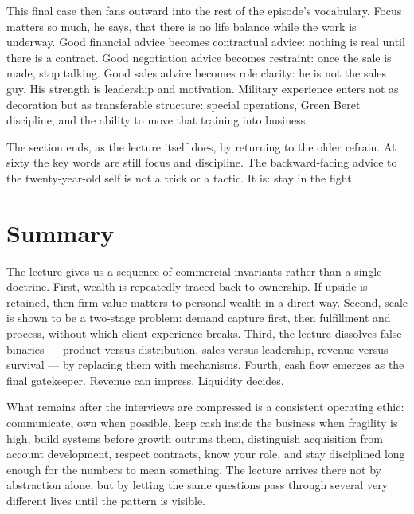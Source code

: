 This final case then fans outward into the rest of the episode's vocabulary. Focus matters so much, he says, that there is no life balance while the work is underway. Good financial advice becomes contractual advice: nothing is real until there is a contract. Good negotiation advice becomes restraint: once the sale is made, stop talking. Good sales advice becomes role clarity: he is not the sales guy. His strength is leadership and motivation. Military experience enters not as decoration but as transferable structure: special operations, Green Beret discipline, and the ability to move that training into business.

The section ends, as the lecture itself does, by returning to the older refrain. At sixty the key words are still focus and discipline. The backward-facing advice to the twenty-year-old self is not a trick or a tactic. It is: stay in the fight.

\section{Summary}

The lecture gives us a sequence of commercial invariants rather than a single doctrine. First, wealth is repeatedly traced back to ownership. If upside is retained, then firm value matters to personal wealth in a direct way. Second, scale is shown to be a two-stage problem: demand capture first, then fulfillment and process, without which client experience breaks. Third, the lecture dissolves false binaries --- product versus distribution, sales versus leadership, revenue versus survival --- by replacing them with mechanisms. Fourth, cash flow emerges as the final gatekeeper. Revenue can impress. Liquidity decides.

What remains after the interviews are compressed is a consistent operating ethic: communicate, own when possible, keep cash inside the business when fragility is high, build systems before growth outruns them, distinguish acquisition from account development, respect contracts, know your role, and stay disciplined long enough for the numbers to mean something. The lecture arrives there not by abstraction alone, but by letting the same questions pass through several very different lives until the pattern is visible.